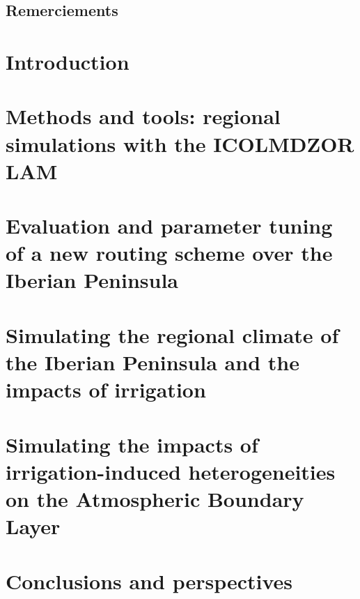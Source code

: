 \documentclass{report}
\begin{document}
\section*{Remerciements}

\clearpage
\dominitoc
\renewcommand*\contentsname{Contents}
\tableofcontents
\newpage

\chapter{Introduction}
\label{chap:introduction}
\minitoc
\pagebreak
% 

\chapter{Methods and tools: regional simulations with the ICOLMDZOR LAM}
\label{chap:methods}
\minitoc
\pagebreak


\chapter{Evaluation and parameter tuning of a new routing scheme over the Iberian Peninsula}
\label{chap:routing}
\minitoc
\pagebreak


\chapter{Simulating the regional climate of the Iberian Peninsula and the impacts of irrigation}
\label{chap:monthly}
\minitoc
\pagebreak
% 

\chapter{Simulating the impacts of irrigation-induced heterogeneities on the Atmospheric Boundary Layer}
\label{chap:liaise}
\minitoc
\pagebreak
% 

\chapter{Conclusions and perspectives}
% 

% 

\newpage


\end{document}
